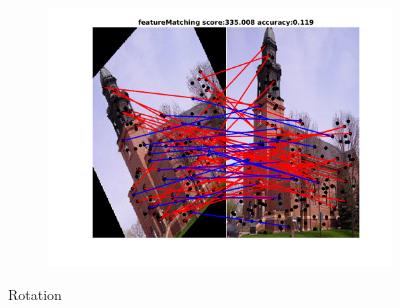 \documentclass[
	fontsize=12pt,
	paper=a4,
	twoside=false,
	numbers=noenddot,
	plainheadsepline,
	toc=listof,
	toc=bibliography
]{scrartcl}
\begin{document}
\begin{figure}[h]
\begin{subfigure}[b]{0.33\textwidth}
	\end{subfigure} 
	\begin{subfigure}[b]{0.33\textwidth}
		\centering
		\includegraphics[scale=0.25]{"fig_ver2608/RealImages/ImgTrafo/no_descr/using_cpd_afftrafo/fi_1_featureMatching"} 
	\end{subfigure} 	
	\caption{Rotation}


\end{figure}
\end{document}
